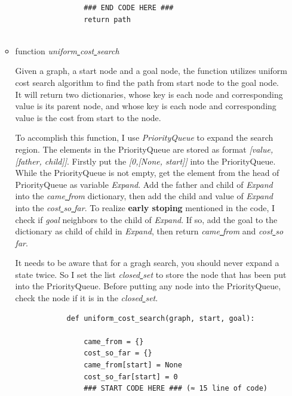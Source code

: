 \documentclass[aps,letterpaper,10pt]{revtex4}
\begin{document}
\begin{itemize}
\begin{itemize}
\begin{lstlisting}
				### END CODE HERE ###
				return path
			
		\end{lstlisting}
		\vspace{3mm}

		\item function \emph{uniform\underline{ }cost\underline{ }search}
		
		Given a graph, a start node and a goal node, 
    	the function utilizes uniform cost search algorithm to find the path from 
    	start node to the goal node. It will return two dictionaries, whose key is each node and corresponding  
		value is its parent node, and whose key is each node and corresponding value is the cost from start to the node.
		\vspace{3mm}

		To accomplish this function, I use \emph{PriorityQueue} to expand the search region. The elements in the PriorityQueue are stored as format \emph{[value,[father, child]]}.
		Firstly put the \emph{[0,[None, start]]} into the PriorityQueue. While the PriorityQueue is not empty, get the element from the head of PriorityQueue as variable \emph{Expand}.
		Add the father and child of \emph{Expand} into the \emph{came\underline{ }from} dictionary, then add the child and value of \emph{Expand} into the \emph{cost\underline{ }so\underline{ }far}. 
		To realize \textbf{early stoping} mentioned in the code, I check if \emph{goal} neighbors to the child of \emph{Expand}. If so, add the goal to the dictionary as
		child of child in \emph{Expand}, then return \emph{came\underline{ }from} and \emph{cost\underline{ }so\underline{ }far}.
		

		\vspace{3mm}
		It needs to be aware that for a gragh search, you should never expand a state twice. So I set the list \emph{closed\underline{ }set} to store the node that has been put into the PriorityQueue.
		Before putting any node into the PriorityQueue, check the node if it is in the \emph{closed\underline{ }set}.

		\begin{lstlisting}
			def uniform_cost_search(graph, start, goal):
    
				came_from = {}
				cost_so_far = {}
				came_from[start] = None
				cost_so_far[start] = 0
				### START CODE HERE ### (≈ 15 line of code)


\end{lstlisting}
\end{itemize}
\end{itemize}
\end{document}
